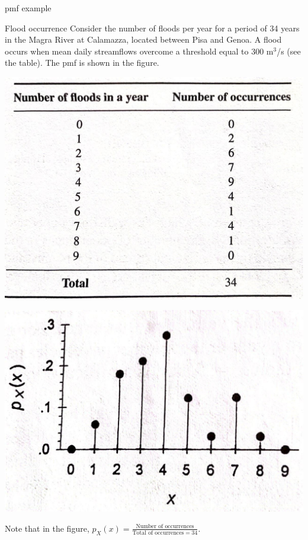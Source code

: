 \documentclass[8pt]{beamer}
\begin{document}
\begin{frame}{pmf example}

    \begin{exampleblock}{Flood occurrence}
        Consider the number of floods per year for a period of 34 years in the Magra River at Calamazza, located between Pisa and Genoa. A flood occurs when mean daily streamflows overcome a threshold equal to 300 m$^3$/s (see the table). The pmf is shown in the figure.
        \begin{minipage}{0.49\textwidth}
            \includegraphics[width=\linewidth]{ta111.jpeg}
        \end{minipage}
        \hfill
        \begin{minipage}{0.5\textwidth}
            \includegraphics[width=\linewidth]{fi311.jpeg}
        \end{minipage}
    Note that in the figure,  $p_X(x) =\frac{\text{Number of occurrences}}{\text{Total of occurrences} = 34}$. 
    \end{exampleblock}    

\end{frame}
\end{document}
